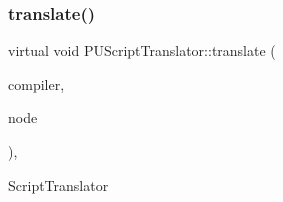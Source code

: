 \mbox{\label{classPUScriptTranslator_a9ff2cdfda9ea8db6fd716e7b69dbe79b}} 
\subsubsection{\texorpdfstring{translate()}{translate()}\hspace{0.1cm}{\footnotesize\ttfamily [2/2]}}
{\footnotesize\ttfamily virtual void P\+U\+Script\+Translator\+::translate (\begin{DoxyParamCaption}\item[{\hyperlink{classPUScriptCompiler}{P\+U\+Script\+Compiler} $\ast$}]{compiler,  }\item[{\hyperlink{classPUAbstractNode}{P\+U\+Abstract\+Node} $\ast$}]{node }\end{DoxyParamCaption})\hspace{0.3cm}{\ttfamily [inline]}, {\ttfamily [virtual]}}

Script\+Translator 

